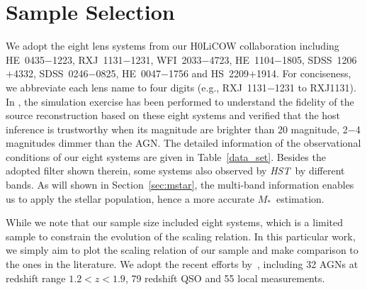 \documentclass[fleqn,usenatbib]{mnras}
\newcommand{\hst}{{\it HST}}
\newcommand{\mstar}{{$M_*$}}
\begin{document}
\section{Sample Selection}
We adopt the eight lens systems from our H0LiCOW collaboration including HE~0435$-$1223, RXJ~1131$-$1231, WFI~2033$-$4723, HE~1104$-$1805, SDSS~1206$+$4332, SDSS~0246$-$0825, HE~0047$-$1756 and HS~2209$+$1914. For conciseness, we abbreviate each lens name to four digits (e.g., RXJ~1131$-$1231 to RXJ1131). In \citet{Ding2017a}, the simulation exercise has been performed to understand the fidelity of the source reconstruction based on these eight systems and verified that the host inference is trustworthy when its magnitude are brighter than 20 magnitude, 2$-$4 magnitudes dimmer than the AGN. The detailed information of the observational conditions of our eight systems are given in Table~\ref{data_set}. Besides the adopted filter shown therein, some systems also observed by \hst\ by different bands. As will shown in Section~\ref{sec:mstar}, the multi-band information enables us to apply the stellar population, hence a more accurate \mstar\ estimation. 


While we note that our sample size included eight systems, which is a limited sample to constrain the evolution of the scaling relation. In this particular work, we simply aim to plot the scaling relation of our sample and make comparison to the ones in the literature. %
We adopt the recent efforts by~\citet{Ding2020}, including 32 AGNs at redshift range $1.2<z<1.9$, 79 redshift QSO and 55 local measurements.
\end{document}

